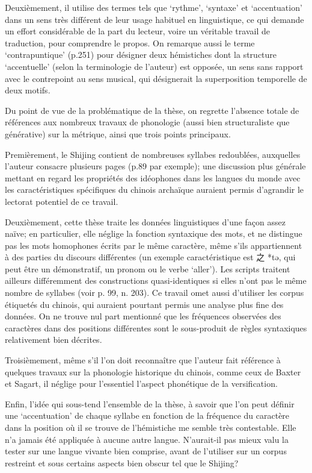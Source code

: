 \documentclass[oldfontcommands,oneside,a4paper,11pt]{article}
\newcommand{\ipa}[1]{{\phon \mbox{#1}}} %
\newcommand{\zh}[1]{{\cn #1}}
\begin{document}
Deuxièmement, il utilise des termes tels que `rythme', `syntaxe' et `accentuation' dans un sens très différent de leur usage habituel en linguistique, ce qui demande un effort considérable de la part du lecteur, voire un véritable travail de traduction, pour comprendre le propos. On remarque aussi le terme `contrapuntique' (p.251) pour désigner deux hémistiches dont la structure `accentuelle' (selon la terminologie de l'auteur) est opposée, un sens sans rapport avec le contrepoint au sens musical, qui désignerait la superposition temporelle de deux motifs.

Du point de vue de la problématique de la thèse, on regrette l'absence totale de références aux nombreux travaux de phonologie (aussi bien structuraliste que générative) sur la métrique, ainsi que trois points principaux.

Premièrement, le Shijing contient de nombreuses syllabes redoublées, auxquelles l'auteur consacre plusieurs pages (p.89 par exemple); une discussion plus générale mettant en regard les propriétés des idéophones dans les langues du monde avec les caractéristiques spécifiques du chinois archaïque auraient permis d'agrandir le lectorat potentiel de ce travail.

Deuxièmement, cette thèse traite les données linguistiques d'une façon assez naïve; en particulier, elle néglige la fonction syntaxique des mots, et ne distingue pas les mots homophones écrits par le même caractère, même s'ils appartiennent à des parties du discours différentes (un exemple caractéristique est \zh{之} *\ipa{tə}, qui peut être un démonstratif, un pronom ou le verbe `aller'). Les scripts traitent ailleurs différemment des constructions quasi-identiques si elles n'ont pas le même nombre de syllabes (voir p. 99, n. 203). Ce travail omet aussi d'utiliser les corpus étiquetés du chinois, qui auraient pourtant permis une analyse plus fine des données. On ne trouve nul part mentionné que les fréquences observées des caractères dans des positions différentes sont le sous-produit de règles syntaxiques relativement bien décrites.


Troisièmement, même s'il l'on doit reconnaître que l'auteur fait référence à quelques travaux sur la phonologie historique du chinois, comme ceux de Baxter et Sagart, il néglige pour l'essentiel l'aspect phonétique de la versification.

Enfin, l'idée qui sous-tend l'ensemble de la thèse, à savoir que l'on peut définir une `accentuation' de chaque syllabe en fonction de la fréquence du caractère dans la position où il se trouve de l'hémistiche me semble très contestable. Elle n'a jamais été appliquée à aucune autre langue. N'aurait-il pas mieux valu la tester sur une langue vivante bien comprise, avant de l'utiliser sur un corpus restreint et sous certains aspects bien obscur tel que le Shijing?
\end{document}
